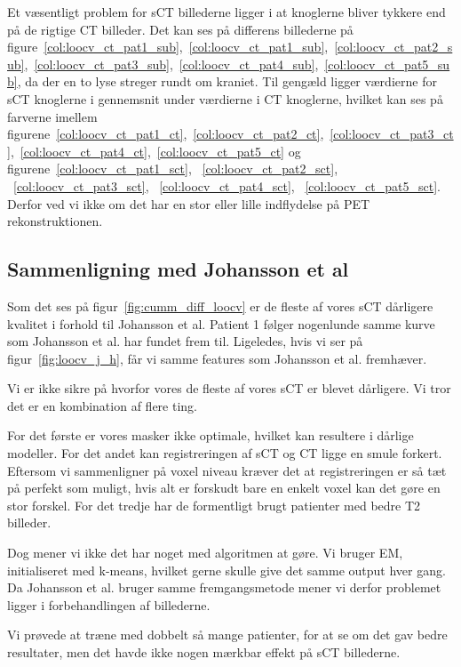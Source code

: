 Et væsentligt problem for sCT billederne ligger i at knoglerne bliver tykkere end på de rigtige CT billeder. Det kan ses på differens billederne på figure~\ref{col:loocv_ct_pat1_sub},~\ref{col:loocv_ct_pat1_sub},~\ref{col:loocv_ct_pat2_sub},~\ref{col:loocv_ct_pat3_sub},~\ref{col:loocv_ct_pat4_sub},~\ref{col:loocv_ct_pat5_sub}, da der en to lyse streger rundt om kraniet. Til gengæld ligger værdierne for sCT knoglerne i gennemsnit under værdierne i CT knoglerne, hvilket kan ses på farverne imellem figurene~\ref{col:loocv_ct_pat1_ct},~\ref{col:loocv_ct_pat2_ct},~\ref{col:loocv_ct_pat3_ct},~\ref{col:loocv_ct_pat4_ct},~\ref{col:loocv_ct_pat5_ct} og figurene~\ref{col:loocv_ct_pat1_sct},
~\ref{col:loocv_ct_pat2_sct},
~\ref{col:loocv_ct_pat3_sct},
~\ref{col:loocv_ct_pat4_sct},
~\ref{col:loocv_ct_pat5_sct}. Derfor ved vi ikke om det har en stor eller lille indflydelse på PET rekonstruktionen.

\subsection{Sammenligning med Johansson et al}


Som det ses på figur~\ref{fig:cumm_diff_loocv} er de fleste af vores sCT dårligere kvalitet i forhold til Johansson et al. Patient 1 følger nogenlunde samme kurve som Johansson et al. har fundet frem til. Ligeledes, hvis vi ser på figur~\ref{fig:loocv_j_h}, får vi samme features som Johansson et al. fremhæver.


Vi er ikke sikre på hvorfor vores de fleste af vores sCT er blevet dårligere. Vi tror det er en kombination af flere ting. 


For det første er vores masker ikke optimale, hvilket kan resultere i dårlige modeller. For det andet kan registreringen af sCT og CT ligge en smule forkert. Eftersom vi sammenligner på voxel niveau kræver det at registreringen er så tæt på perfekt som muligt, hvis alt er forskudt bare en enkelt voxel kan det gøre en stor forskel. For det tredje har de formentligt brugt patienter med bedre T2 billeder.


Dog mener vi ikke det har noget med algoritmen at gøre. Vi bruger EM, initialiseret med k-means, hvilket gerne skulle give det samme output hver gang. Da Johansson et al. bruger samme fremgangsmetode mener vi derfor problemet ligger i forbehandlingen af billederne.


Vi prøvede at træne med dobbelt så mange patienter, for at se om det gav bedre resultater, men det havde ikke nogen mærkbar effekt på sCT billederne.


